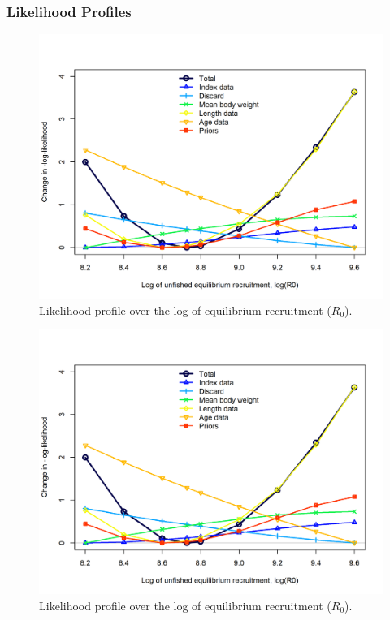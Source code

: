 \documentclass[12pt,]{article}
\begin{document}
\newpage

\hypertarget{likelihood-profiles-1}{%
\subsubsection{Likelihood Profiles}\label{likelihood-profiles-1}}

\FloatBarrier

\vspace{.5cm}

\begin{figure}[h]
\begin{centering}
\includegraphics{Figures/profile_logR0.png}
\caption{Likelihood profile over the log of equilibrium recruitment ($R_0$).}\label{fig:profile_logR0}
\end{centering}
\end{figure}

\newpage

\begin{figure}
\centering
\includegraphics{Figures/profile_logR0.png}
\caption{Likelihood profile over the log of equilibrium recruitment
(\(R_0\)).\label{fig:profile_logR0}}
\end{figure}
\end{document}
